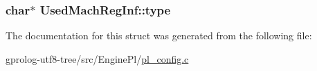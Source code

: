 \subsubsection[{\texorpdfstring{type}{type}}]{\setlength{\rightskip}{0pt plus 5cm}char$\ast$ Used\+Mach\+Reg\+Inf\+::type}\hypertarget{structUsedMachRegInf_a2e0c08014802409c0a340c61fab7dafe}{}\label{structUsedMachRegInf_a2e0c08014802409c0a340c61fab7dafe}


The documentation for this struct was generated from the following file\+:\begin{DoxyCompactItemize}
\item 
gprolog-\/utf8-\/tree/src/\+Engine\+Pl/\hyperlink{pl__config_8c}{pl\+\_\+config.\+c}\end{DoxyCompactItemize}
